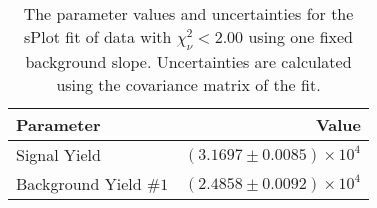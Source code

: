 
\begin{table}[ht]
    \begin{center}
        \begin{tabular}{lr}\toprule
            Parameter & Value \\\midrule
            Signal Yield & $(3.1697 \pm 0.0085) \times 10^{4}$ \\
            Background Yield $\#1$ & $(2.4858 \pm 0.0092) \times 10^{4}$ \\\bottomrule
        \end{tabular}
        \caption{The parameter values and uncertainties for the sPlot fit of data with $\chi^2_\nu < 2.00$ using one fixed background slope. Uncertainties are calculated using the covariance matrix of the fit.}\label{tab:splot-fit-results-chisqdof-2.00-fixed-1}
    \end{center}
\end{table}
